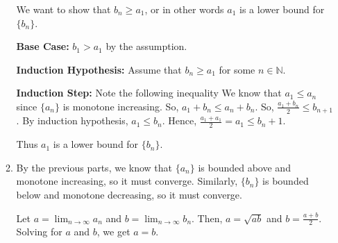 \documentclass[12pt]{article}
\begin{document}
\begin{enumerate}[start=1,label={\bfseries Problem \arabic*:},leftmargin=1in]
\begin{enumerate}
        We want to show that $b_{n} \geq a_{1}$, or in other words $a_{1}$ is a lower bound for $\{b_{n}\}$.
    
        \textbf{Base Case:} $b_{1} > a_{1}$ by the assumption.
    
        \textbf{Induction Hypothesis:} Assume that $b_{n} \geq a_{1}$ for some $n \in \mathbb{N}$.
    
        \textbf{Induction Step:} Note the following inequality 
        We know that $a_{1} \leq a_{n}$ since $\{ a_{n} \}$ is monotone increasing. 
        So, $a_{1} + b_{n} \leq a_{n} + b_{n}$. So, $\frac{a_{1}+b_{n}}{2} \leq b_{n+1}$. 
        By induction hypothesis, $a_{1} \leq b_{n}$. Hence, $\frac{a_{1} + a_{1}}{2} = a_{1} \leq b_{n}+1$. 
        
        Thus $a_{1}$ is a lower bound for $\{b_{n}\}$.
    
        \item By the previous parts, we know that $\{a_{n}\}$ is bounded above and monotone increasing, so it must converge. 
        Similarly, $\{b_{n}\}$ is bounded below and monotone decreasing, so it must converge. 

        Let $a = \lim_{n \to \infty} a_{n}$ and $b = \lim_{n \to \infty} b_{n}$. 
        Then, $a = \sqrt{ab}$ and $b = \frac{a+b}{2}$. Solving for $a$ and $b$, we get $a = b$.
    \end{enumerate}

    

\end{enumerate}
\end{document}
